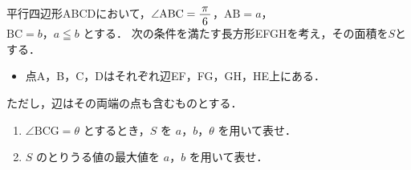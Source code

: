﻿\documentclass[../../../uem_tok_q.tex]{subfiles}
\begin{document}
    平行四辺形ABCDにおいて，$\angle\mathrm{ABC}=\myfraca{\pi}{6}$，$\mathrm{AB}=a$，\\
    $\mathrm{BC}=b$，$a\leqq b$ とする．%
    次の条件を満たす長方形EFGHを考え，その面積を$S$とする．
    
    \begin{itemize}[label={条件：}, leftmargin=4\zw, labelsep=.7\zw, topsep=4pt]
        \item 点A，B，C，Dはそれぞれ辺EF，FG，GH，HE上にある．
    \end{itemize}
    ただし，辺はその両端の点も含むものとする．
    \begin{enumerate}
        \item $\angle\mathrm{BCG}=\theta$ とするとき，$S$ を $a$，$b$，$\theta$ を用いて表せ．
        \item $S$ のとりうる値の最大値を $a$，$b$ を用いて表せ．
    \end{enumerate}
\end{document}
